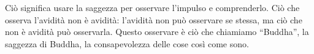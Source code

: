 Ciò significa usare la saggezza per osservare l'impulso e comprenderlo.
Ciò che osserva l'avidità non è avidità: l'avidità non può osservare se
stessa, ma ciò che non è avidità può osservarla. Questo osservare è ciò
che chiamiamo “Buddha”, la saggezza di Buddha, la consapevolezza delle
cose così come sono.

